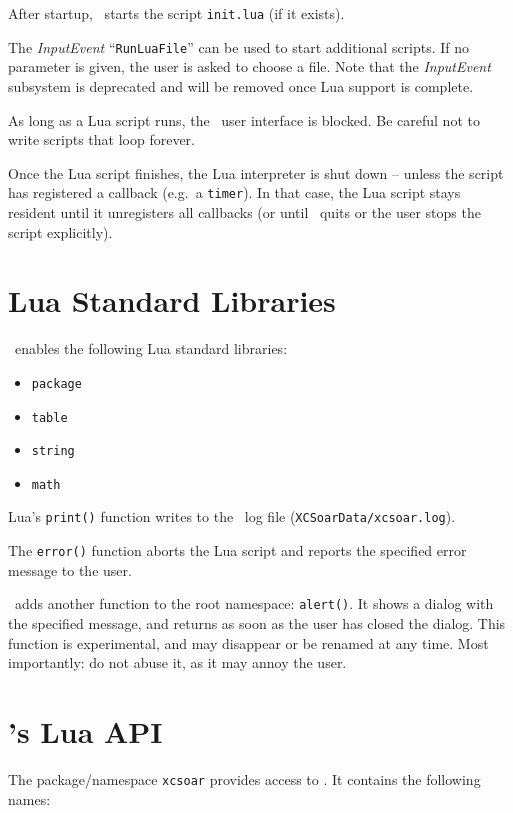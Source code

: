 After startup, \xc\ starts the script \texttt{init.lua} (if it
exists).

The \emph{InputEvent} ``\texttt{RunLuaFile}'' can be used to start
additional scripts.  If no parameter is given, the user is asked to
choose a file.  Note that the \emph{InputEvent} subsystem is
deprecated and will be removed once Lua support is complete.

As long as a Lua script runs, the \xc\ user interface is blocked.
Be careful not to write scripts that loop forever.

Once the Lua script finishes, the Lua interpreter is shut down --
unless the script has registered a callback (e.g.\ a \verb|timer|).  In
that case, the Lua script stays resident until it unregisters all
callbacks (or until \xc\ quits or the user stops the script
explicitly).

\section{Lua Standard Libraries}

\xc\ enables the following Lua standard libraries:

\begin{itemize}
\item \verb|package|
\item \verb|table|
\item \verb|string|
\item \verb|math|
\end{itemize}

Lua's \verb|print()| function writes to the \xc\ log file
(\texttt{XCSoarData/xcsoar.log}).

The \verb|error()| function aborts the Lua script and reports the
specified error message to the user.

\xc\ adds another function to the root namespace: \verb|alert()|.
It shows a dialog with the specified message, and returns as soon as
the user has closed the dialog.  This function is experimental, and
may disappear or be renamed at any time.  Most importantly: do not
abuse it, as it may annoy the user.

\section{\xc's Lua API}

The package/namespace \verb|xcsoar| provides access to \xc.  It
contains the following names:

